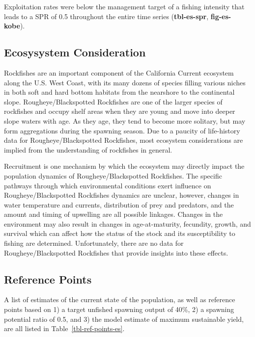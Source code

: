 \documentclass[
]{scrartcl}
\begin{document}
Exploitation rates were below the management target of a fishing
intensity that leads to a SPR of 0.5 throughout the entire time series
(\textbf{tbl-es-spr}, \textbf{fig-es-kobe}).

\subsection{Ecosysystem Consideration}\label{ecosysystem-consideration}

Rockfishes are an important component of the California Current
ecosystem along the U.S. West Coast, with its many dozens of species
filling various niches in both soft and hard bottom habitats from the
nearshore to the continental slope. Rougheye/Blackspotted Rockfishes are
one of the larger species of rockfishes and occupy shelf areas when they
are young and move into deeper slope waters with age. As they age, they
tend to become more solitary, but may form aggregations during the
spawning season. Due to a paucity of life-history data for
Rougheye/Blackspotted Rockfishes, most ecosystem considerations are
implied from the understanding of rockfishes in general.

Recruitment is one mechanism by which the ecosystem may directly impact
the population dynamics of Rougheye/Blackspotted Rockfishes. The
specific pathways through which environmental conditions exert influence
on Rougheye/Blackspotted Rockfishes dynamics are unclear, however,
changes in water temperature and currents, distribution of prey and
predators, and the amount and timing of upwelling are all possible
linkages. Changes in the environment may also result in changes in
age-at-maturity, fecundity, growth, and survival which can affect how
the status of the stock and its susceptibility to fishing are
determined. Unfortunately, there are no data for Rougheye/Blackspotted
Rockfishes that provide insights into these effects.

\subsection{Reference Points}\label{reference-points}

A list of estimates of the current state of the population, as well as
reference points based on 1) a target unfished spawning output of 40\%,
2) a spawning potential ratio of 0.5, and 3) the model estimate of
maximum sustainable yield, are all listed in
Table~\ref{tbl-ref-points-es}.
\end{document}
